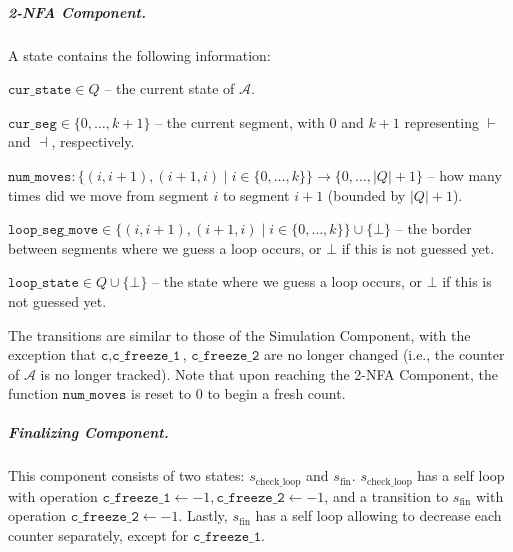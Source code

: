 \documentclass[USenglish]{lipics-v2021}
\newcommand{\lmark}{\vdash}
\newcommand{\rmark}{\dashv}
\newcommand{\adds}[1]{\leftarrow #1}
\newcommand{\vf}[1]{\texttt{#1}}
\newcommand{\cA}{\mathcal{A}}
\begin{document}
\subparagraph*{2-NFA Component.} A state contains the following information:
\begin{compactitem}
\item $\vf{cur\_state}\in Q$ -- the current state of $\cA$.
\item $\vf{cur\_seg}\in \{0,\ldots,k+1\}$ -- the current segment, with $0$ and $k+1$
representing $\lmark$ and $\rmark$, respectively.
\item $\vf{num\_moves}\colon\{(i,i+1),(i+1,i)\mid i\in \{0,\ldots,k\}\}\to \{0,\ldots,|Q|+1\}$ --
how many times did we move from segment $i$ to segment $i+1$ (bounded by
$|Q|+1$).
\item $\vf{loop\_seg\_move}\in \{(i,i+1),(i+1,i)\mid i\in \{0,\ldots,k\}\}\cup\{\bot\}$ -- the
border between segments where we guess a loop occurs, or $\bot$ if this is not
guessed yet.
\item $\vf{loop\_state}\in Q\cup\{\bot\}$ -- the state where we guess a loop occurs,
or $\bot$ if this is not guessed yet.
\end{compactitem} 
The transitions are similar to those of the Simulation Component,
with the exception that $\vf{c},\vf{c\_freeze\_1}$, $\vf{c\_freeze\_2}$ are no
longer changed (i.e., the counter of $\cA$ is no longer tracked). Note that upon
reaching the 2-NFA Component, the function $\vf{num\_moves}$ is reset to $0$ to
begin a fresh count.

\subparagraph*{Finalizing Component.} This component consists of two states:
$s_{\textrm{check\_loop}}$ and $s_{\textrm{fin}}$. $s_{\textrm{check\_loop}}$
has a self loop with operation
$\vf{c\_freeze\_1}\adds{-1},\vf{c\_freeze\_2}\adds{-1}$, and a transition to
$s_{\textrm{fin}}$ with operation $\vf{c\_freeze\_2}\adds{-1}$. Lastly,
$s_{\textrm{fin}}$ has a self loop allowing to decrease each counter separately,
except for $\vf{c\_freeze\_1}$.
\end{document}

